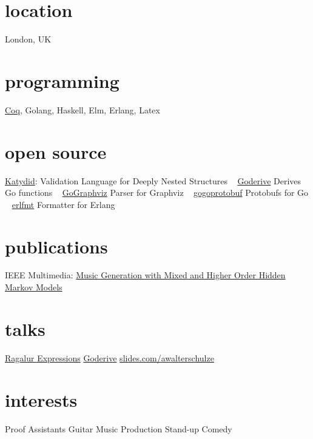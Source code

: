 \documentclass[print]{friggeri-cv-a4} %
\begin{document}

\begin{aside} %
\section{location}
London, UK
\section{programming}
\href{https://coq.inria.fr/}{Coq}, Golang, Haskell, Elm, Erlang, Latex
\section{open source}
\href{https://github.com/katydid/katydid}{Katydid}:
Validation Language for Deeply Nested Structures
~
\href{https://github.com/awalterschulze/goderive}{Goderive} 
Derives Go functions
~
\href{https://github.com/awalterschulze/gographviz}{GoGraphviz} 
Parser for Graphviz
~
\href{https://github.com/gogo/protobuf}{gogoprotobuf} 
Protobufs for Go 
~
\href{https://github.com/WhatsApp/erlfmt}{erlfmt}  
Formatter for Erlang
\section{publications}
IEEE Multimedia: \href{http://doi.ieeecomputersociety.org/10.1109/MMUL.2010.44}{Music Generation with Mixed and Higher Order Hidden Markov Models}
\section{talks}
\href{https://www.youtube.com/playlist?list=PLYwF9EIrl42S9ldgii7kfBEIHPle7PqMk}{\faYoutubePlay Ragalur Expressions} 
\href{https://www.youtube.com/watch?v=qFYByoGFIUE}{\faYoutubePlay Goderive}
\href{https://slides.com/awalterschulze}{slides.com/awalterschulze}
\section{interests}
Proof Assistants
Guitar
Music Production
Stand-up Comedy
\end{aside}
\end{document}
